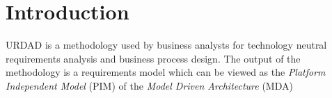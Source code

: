 \section{Introduction}

URDAD is a methodology used by business analysts for technology neutral requirements analysis and 
business process design\cite{solms_technology_2007}. 
The output of the methodology is a requirements model which can be viewed as the 
{\em Platform Independent Model} (PIM) \cite{solms_urdad_2010} of the {\em Model Driven Architecture} (MDA) 

